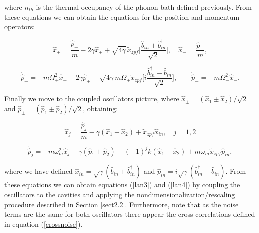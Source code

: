 \documentclass[a4paper]{jpconf}
\begin{document}
\noindent where $n_{th}$ is the thermal occupancy  of the phonon bath defined previously. From these equations we can obtain the equations for the position and momentum 
operators:

\begin{equation}
\dot{\hat{x}}_+=\frac{\hat{p}_+}{m}-2\gamma\hat{x}_++\sqrt{4\gamma}\,\tilde{x}_{zpf}\big[\frac{\hat{b}_{in}+\hat{b}_{in}^\dagger}{\sqrt{2}}\big],\label{A.6} 
\quad \dot{\hat{x}}_-=\frac{\hat{p}_-}{m},
\end{equation}

\begin{equation}
\dot{\hat{p}}_+=-m\Omega_+^2\hat{x}_+-2\gamma\hat{p}_++\sqrt{4\gamma}\,m\Omega_+\tilde{x}_{zpf}\big[i\frac{\hat{b}^\dagger_{in}-\hat{b}_{in}}{\sqrt{2}}\big], 
\quad \quad \dot{\hat{p}}_-=-m\Omega_-^2\hat{x}_-.\label{A.7}
\end{equation}

Finally we move to the coupled oscillators picture, where $\hat{x}_{\pm}=(\hat{x}_1\pm\hat{x}_2)/\sqrt{2}$ and $\hat{p}_{\pm}=(\hat{p}_1\pm\hat{p}_2)/\sqrt{2}$, 
obtaining:

\begin{equation}
\dot{\hat{x}}_j=\frac{\hat{p}_j}{m}-\gamma(\hat{x}_1+\hat{x}_2)+\tilde{x}_{zpf}\hat{x}_{in}, \quad j=1,2\label{A.8}
\end{equation}

\begin{equation}
\dot{\hat{p}}_j=-m\omega_m^2\hat{x}_j-\gamma(\hat{p}_1+\hat{p}_2)+(-1)^j k(\hat{x}_1-\hat{x}_2)+
m\omega_m\tilde{x}_{zpf}\hat{p}_{in},\label{A.9}
\end{equation}

\noindent where we have defined $\hat{x}_{in}=\sqrt{\gamma}(\hat{b}_{in}+\hat{b}_{in}^\dagger)$ and $\hat{p}_{in}=i\sqrt{\gamma}(\hat{b}_{in}^\dagger-\hat{b}_{in})$. From these 
equations we can obtain equations (\ref{lan3}) and (\ref{lan4}) by coupling the oscillators to the cavities and applying the nondimensionalization/rescaling procedure described
in Section \ref{sect2.2}. Furthermore, note that as the noise terms are the same for both oscillators there appear the cross-correlations defined in equation (\ref{crossnoise}).
\end{document}
